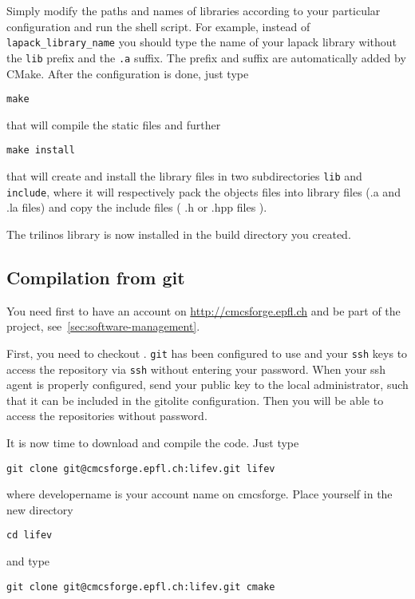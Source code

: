 Simply modify the paths and names of libraries according to your particular configuration and run the shell script.
For example, instead of \verb!lapack_library_name! you should type the name of your lapack library without the
\verb!lib! prefix and the \verb!.a! suffix. The prefix and suffix are automatically added by CMake.
After the configuration is done, just type
\begin{verbatim}
make
\end{verbatim}
that  will compile the static files and further
\begin{verbatim}
make install
\end{verbatim}
that will create and install the library files
in two subdirectories \verb|lib| and \verb|include|, where
it will respectively pack the objects files into library files (.a and .la files)
and copy the include files ( .h or .hpp files ).

The trilinos library is now installed in the build directory you created.

\subsection{Compilation from git}
\label{sec:compile-cvs}
You need first to have an account on \url{http://cmcsforge.epfl.ch} and
be part of the \lifev project, see~\ref{sec:software-management}.

First, you need to checkout \lifev. \verb!git! has
been configured to use  and your \verb!ssh! keys to
access the repository via \verb!ssh! without entering your password. When your ssh agent is properly configured,
send your public key to the local administrator, such that it can be included in
the gitolite configuration.
Then you will be able to access the
repositories without password.

It is now time to download and compile the code.
Just type
\begin{verbatim}
git clone git@cmcsforge.epfl.ch:lifev.git lifev
\end{verbatim}
where developername is your account name on cmcsforge. Place yourself in the new directory

\begin{verbatim}
cd lifev
\end{verbatim}
and type
\begin{verbatim}
git clone git@cmcsforge.epfl.ch:lifev.git cmake
\end{verbatim}



